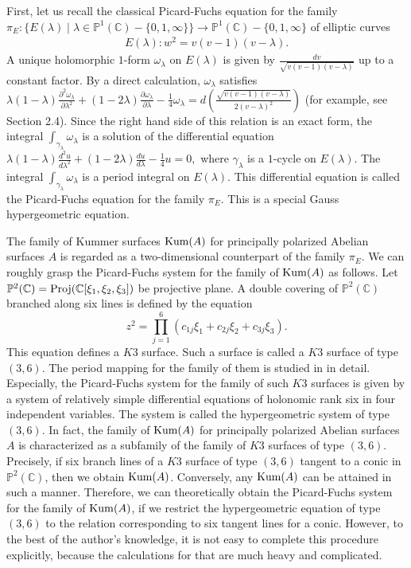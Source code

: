 \documentclass[10pt]{article}
\begin{document}
First, let us  recall the classical Picard-Fuchs equation for the family
$\pi_E: \{E(\lambda) \mid \lambda \in \mathbb{P}^1(\mathbb{C})-\{0,1,\infty \} \} \rightarrow \mathbb{P}^1(\mathbb{C})-\{0,1,\infty \}$
of elliptic curves 
\begin{align}\label{EllipticCurve}
E(\lambda) : w^2=v(v-1)(v-\lambda).
\end{align}
A unique  holomorphic $1$-form $\omega_\lambda $  on $E(\lambda)$ is given 
by $\frac{dv}{\sqrt{v(v-1)(v-\lambda)}}$ up to a constant factor.
By a direct calculation, $\omega_\lambda $ satisfies
$
\lambda (1- \lambda) \frac{\partial^2 \omega_\lambda}{\partial \lambda^2} +(1-2\lambda) \frac{\partial \omega_\lambda}{\partial \lambda} -\frac{1}{4} \omega_\lambda = d\left( \frac{\sqrt{v (v-1) (v-\lambda)}}{2(v-\lambda)^2} \right)
$
(for example, see \cite{SU} Section 2.4).
Since the right hand side of this relation is an exact form, 
the integral $\int_{\gamma_\lambda} \omega_\lambda$ is a solution of the differential equation 
$
\lambda (1- \lambda) \frac{d^2 u}{d \lambda^2} +(1-2\lambda) \frac{d u}{d \lambda} -\frac{1}{4} u = 0,
$
where $\gamma_\lambda$ is a $1$-cycle on $E(\lambda)$.
The integral $\int_{\gamma_\lambda} \omega_\lambda$ is a period integral on $E(\lambda)$.
This differential equation is called the Picard-Fuchs equation for the family $\pi_E$.
This is a special Gauss hypergeometric equation. 



The family of Kummer surfaces ${\rm Kum}(A)$ for  principally polarized Abelian surfaces $A$ is regarded as a two-dimensional counterpart of the family $\pi_E$.
We can roughly grasp the Picard-Fuchs system for the family of  ${\rm Kum}(A)$ as follows.
Let $\mathbb{P}^2(\mathbb{C})={\rm Proj}(\mathbb{C}[\xi_1,\xi_2,\xi_3])$ be projective plane.
A double covering of $\mathbb{P}^2(\mathbb{C})$ branched along six lines is defined by the equation
$$
z^2 = \prod_{j=1}^6 (c_{1j} \xi_1+ c_{2j} \xi_2 + c_{3j} \xi_3).
$$
This equation defines a $K3 $ surface.
Such a  surface is called a $K3$ surface of type $(3,6)$.
The period mapping for the family of them is studied in   \cite{MSY}  in detail.
Especially, the Picard-Fuchs system for the family of such $K3$ surfaces is given by a system of relatively simple differential equations of holonomic rank six in four independent variables.
The system is called the hypergeometric system of type $(3,6)$. 
In fact, the family of ${\rm Kum}(A)$ for principally polarized Abelian surfaces $A$ is characterized as a subfamily of the family of $K3$ surfaces of type $(3,6)$.
Precisely, if six branch lines of a $K3$ surface of type $(3,6)$ tangent to a conic in $\mathbb{P}^2(\mathbb{C})$,
then we obtain ${\rm Kum}(A)$.
Conversely, any ${\rm Kum}(A)$ can be attained in such a manner.
Therefore, we can theoretically obtain the Picard-Fuchs system for the family of ${\rm Kum}(A)$, if we restrict  the hypergeometric equation of type $(3,6)$ to the relation corresponding to six tangent lines for a conic.
However, to the best of the author's knowledge, 
it is not easy to complete this procedure explicitly, because the calculations for that are much heavy and complicated.
\end{document}
